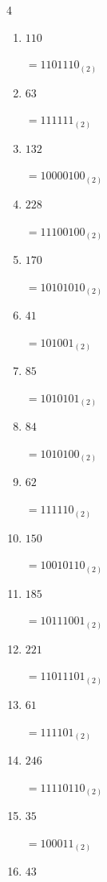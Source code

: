 \begin{multicols}{4}
\begin{enumerate}
        $=1100_{(2)}$

  \item $110$

        $=1101110_{(2)}$

  \item $63$

        $=111111_{(2)}$

  \item $132$

        $=10000100_{(2)}$

  \item $228$

        $=11100100_{(2)}$

\columnbreak %

  \item $170$

        $=10101010_{(2)}$

  \item $41$

        $=101001_{(2)}$

  \item $85$

        $=1010101_{(2)}$

  \item $84$

        $=1010100_{(2)}$

  \item $62$

        $=111110_{(2)}$

  \item $150$

        $=10010110_{(2)}$

  \item $185$

        $=10111001_{(2)}$

  \item $221$

        $=11011101_{(2)}$

  \item $61$

        $=111101_{(2)}$

  \item $246$

        $=11110110_{(2)}$

  \item $35$

        $=100011_{(2)}$

  \item $43$


\end{enumerate}
\end{multicols}
